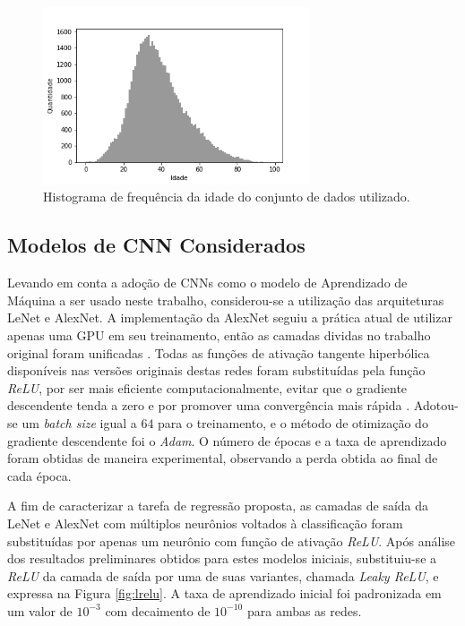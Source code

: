 \begin{figure}
    \centering
     \includegraphics[width=0.7\textwidth]{img/idade_hist_clean}
     \caption{Histograma de frequência da idade do conjunto de dados utilizado.}
     \label{fig:hist}
\end{figure}

\subsection{Modelos de CNN Considerados}
Levando em conta a adoção de CNNs como o modelo de Aprendizado de Máquina a ser usado neste trabalho, considerou-se a utilização das arquiteturas LeNet e AlexNet. A implementação da AlexNet seguiu a prática atual de utilizar apenas uma GPU em seu treinamento, então as camadas dividas no trabalho original foram unificadas \cite{tensorflow:alexnet}. Todas as funções de ativação tangente hiperbólica disponíveis nas versões originais destas redes foram substituídas pela função \emph{ReLU}, por ser mais eficiente computacionalmente, evitar que o gradiente descendente tenda a zero e por promover uma convergência mais rápida \cite{maas2013rectifier}. Adotou-se um \emph{batch size} igual a $64$ para o treinamento, e o método de otimização do gradiente descendente foi o \emph{Adam}. O número de épocas e a taxa de aprendizado foram obtidas de maneira experimental, observando a perda obtida ao final de cada época.

A fim de caracterizar a tarefa de regressão proposta, as camadas de saída da LeNet e AlexNet com múltiplos neurônios voltados à classificação foram substituídas por apenas um neurônio com função de ativação \emph{ReLU}. Após análise dos resultados preliminares obtidos para estes modelos iniciais, substituiu-se a \emph{ReLU} da camada de saída por uma de suas variantes, chamada \emph{Leaky ReLU}, e expressa na Figura \ref{fig:lrelu}. A taxa de aprendizado inicial foi padronizada em um valor de $10^{-3}$ com decaimento de $10^{-10}$ para ambas as redes.

